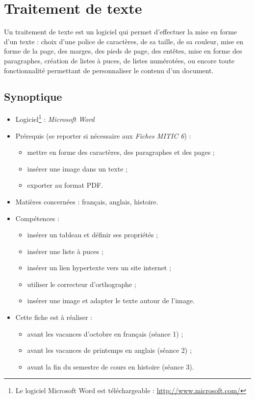 \chapter{Traitement de texte}  

Un traitement de texte est un logiciel qui permet d'effectuer la mise en forme d'un texte : choix d'une police de caractères, de sa taille, de sa couleur, mise en forme de la page, des marges, des pieds de page, des entêtes, mise en forme des paragraphes, création de listes à puces, de listes numérotées, ou encore toute fonctionnalité permettant de personnaliser le contenu d'un document.

\section*{Synoptique}

{\footnotesize
\begin{itemize}
\item Logiciel\footnote{Le logiciel Microsoft Word est téléchargeable : \url{http://www.microsoft.com/}} : \emph{Microsoft Word} 
\item Prérequis (se reporter si nécessaire aux \emph{Fiches MITIC 6}) : 
        \begin{itemize}
        \item mettre en forme des caractères, des paragraphes et des pages ;
        \item insérer une image dans un texte ;
        \item exporter au format PDF.
        \end{itemize}
\item Matières concernées : français, anglais, histoire.
\item Compétences : 
        \begin{itemize}
        \item insérer un tableau et définir ses propriétés ;
        \item insérer une liste à puces ;
        \item insérer un lien hypertexte vers un site internet ;
        \item utiliser le correcteur d'orthographe ;
        \item insérer une image et adapter le texte autour de l'image.
        \end{itemize}
\item Cette fiche est à réaliser :
        \begin{itemize}
        \item avant les vacances d'octobre en français (séance 1) ;
        \item avant les vacances de printemps en anglais (séance 2) ;
        \item avant la fin du semestre de cours en histoire (séance 3). 
        \end{itemize}
\end{itemize}
}%
\vspace{12pt}


